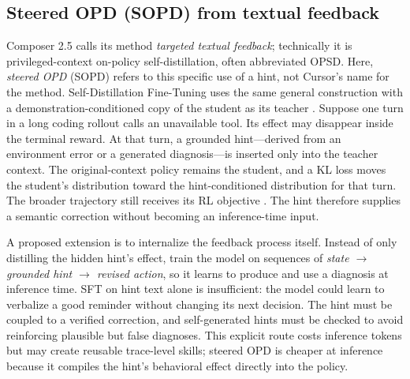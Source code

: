 \subsection{Steered OPD (SOPD) from textual feedback}

Composer 2.5 calls its method \emph{targeted textual feedback}; technically it is
privileged-context on-policy self-distillation, often abbreviated OPSD. Here, \emph{steered
OPD} (SOPD) refers to this specific use of a hint, not Cursor's name for the method.
Self-Distillation Fine-Tuning uses the same general construction with a
demonstration-conditioned copy of the student as its teacher
\citep{shenfeld2026selfdistillation}.
Suppose one turn in a long coding rollout calls an unavailable tool. Its effect may
disappear inside the terminal reward. At that turn, a grounded hint---derived from an
environment error or a generated diagnosis---is inserted only into the teacher context.
The original-context policy remains the student, and a KL loss moves the student's
distribution toward the hint-conditioned distribution for that turn. The broader
trajectory still receives its RL objective \citep{cursor2026composer25}. The hint therefore
supplies a semantic correction without becoming an inference-time input.

A proposed extension is to internalize the feedback process itself. Instead of only
distilling the hidden hint's effect, train the model on sequences of
\emph{state $\rightarrow$ grounded hint $\rightarrow$ revised action}, so it learns to
produce and use a diagnosis at inference time. SFT on hint text alone is insufficient: the
model could learn to verbalize a good reminder without changing its next decision. The
hint must be coupled to a verified correction, and self-generated hints must be checked to
avoid reinforcing plausible but false diagnoses. This explicit route costs inference
tokens but may create reusable trace-level skills; steered OPD is cheaper at inference
because it compiles the hint's behavioral effect directly into the policy.
